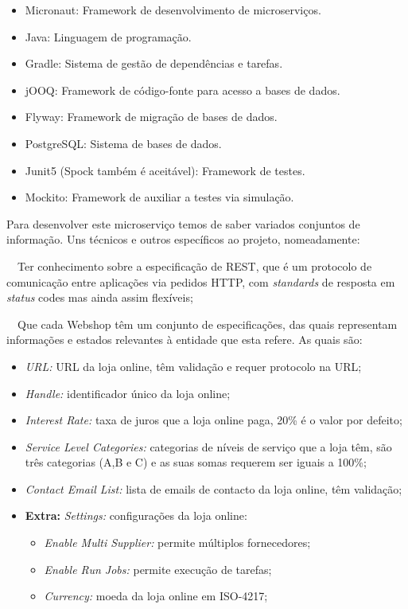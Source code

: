 \begin{itemize}
  \item Micronaut: Framework de desenvolvimento de microserviços.
  \item Java: Linguagem de programação.
  \item Gradle: Sistema de gestão de dependências e tarefas.
  \item jOOQ: Framework de código-fonte para acesso a bases de dados.
  \item Flyway: Framework de migração de bases de dados.
  \item PostgreSQL: Sistema de bases de dados.
  \item Junit5 (Spock também é aceitável): Framework de testes.
  \item Mockito: Framework de auxiliar a testes via simulação.
\end{itemize}

Para desenvolver este microserviço temos de saber variados conjuntos de informação. Uns técnicos e outros específicos ao projeto, nomeadamente:

\noindent\ \bullet\ Ter conhecimento sobre a especificação de REST, que é um protocolo de comunicação entre aplicações via pedidos HTTP, com \textit{standards} de resposta em \textit{status} codes mas ainda assim flexíveis;

\noindent\ \bullet\ Que cada Webshop têm um conjunto de especificações, das quais representam informações e estados relevantes à entidade que esta refere. As quais são:

\begin{itemize}
  \item \textit{URL:} URL da loja online, têm validação e requer protocolo na URL;
  \item \textit{Handle:} identificador único da loja online;
  \item \textit{Interest Rate:} taxa de juros que a loja online paga, 20\% é o valor por defeito;
  \item \textit{Service Level Categories:} categorias de níveis de serviço que a loja têm, são três categorias (A,B e C) e as suas somas requerem ser iguais a 100\%;
  \item \textit{Contact Email List:} lista de emails de contacto da loja online, têm validação;
  \item \textbf{Extra:} \textit{Settings:} configurações da loja online:
    \begin{itemize}
      \item \textit{Enable Multi Supplier:} permite múltiplos fornecedores;
      \item \textit{Enable Run Jobs:} permite execução de tarefas;
      \item \textit{Currency:} moeda da loja online em ISO-4217;
    \end{itemize}
\end{itemize}

